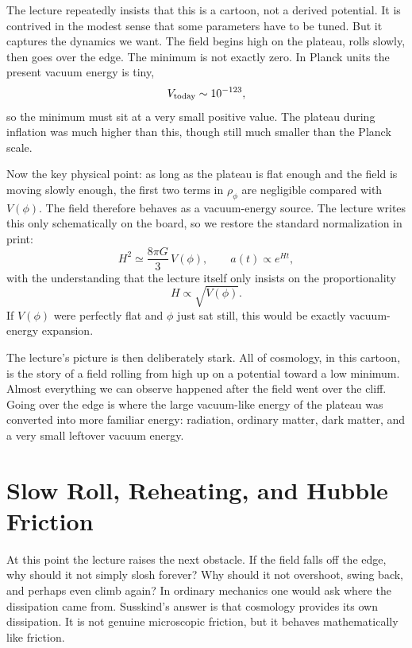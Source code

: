 The lecture repeatedly insists that this is a cartoon, not a derived potential. It is contrived in the modest sense that some parameters have to be tuned. But it captures the dynamics we want. The field begins high on the plateau, rolls slowly, then goes over the edge. The minimum is not exactly zero. In Planck units the present vacuum energy is tiny,
\begin{equation}
V_{\rm today}\sim 10^{-123},
\end{equation}
so the minimum must sit at a very small positive value. The plateau during inflation was much higher than this, though still much smaller than the Planck scale.

Now the key physical point: as long as the plateau is flat enough and the field is moving slowly enough, the first two terms in \(\rho_\phi\) are negligible compared with \(V(\phi)\). The field therefore behaves as a vacuum-energy source. The lecture writes this only schematically on the board, so we restore the standard normalization in print:
\begin{equation}
H^2\simeq \frac{8\pi G}{3}\,V(\phi),
\qquad
a(t)\propto e^{Ht},
\end{equation}
with the understanding that the lecture itself only insists on the proportionality
\begin{equation}
H\propto \sqrt{V(\phi)}.
\end{equation}
If \(V(\phi)\) were perfectly flat and \(\phi\) just sat still, this would be exactly vacuum-energy expansion.

The lecture's picture is then deliberately stark. All of cosmology, in this cartoon, is the story of a field rolling from high up on a potential toward a low minimum. Almost everything we can observe happened after the field went over the cliff. Going over the edge is where the large vacuum-like energy of the plateau was converted into more familiar energy: radiation, ordinary matter, dark matter, and a very small leftover vacuum energy.

\section{Slow Roll, Reheating, and Hubble Friction}

At this point the lecture raises the next obstacle. If the field falls off the edge, why should it not simply slosh forever? Why should it not overshoot, swing back, and perhaps even climb again? In ordinary mechanics one would ask where the dissipation came from. Susskind's answer is that cosmology provides its own dissipation. It is not genuine microscopic friction, but it behaves mathematically like friction.

